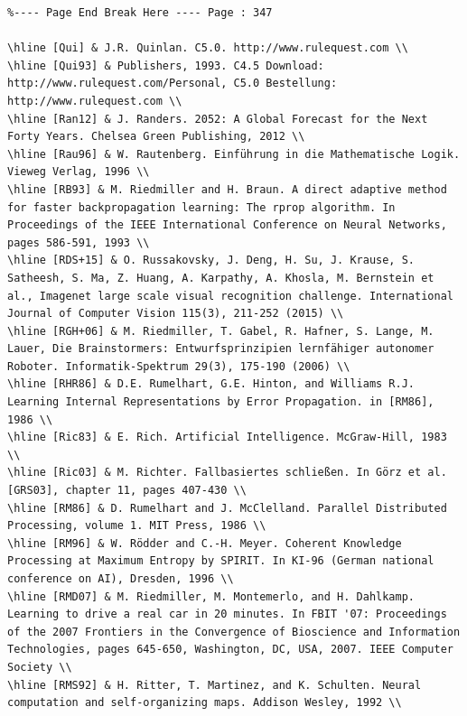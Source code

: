 \documentclass[10pt]{article}
\begin{document}
\begin{verbatim}
%---- Page End Break Here ---- Page : 347

\hline [Qui] & J.R. Quinlan. C5.0. http://www.rulequest.com \\
\hline [Qui93] & Publishers, 1993. C4.5 Download: http://www.rulequest.com/Personal, C5.0 Bestellung: http://www.rulequest.com \\
\hline [Ran12] & J. Randers. 2052: A Global Forecast for the Next Forty Years. Chelsea Green Publishing, 2012 \\
\hline [Rau96] & W. Rautenberg. Einführung in die Mathematische Logik. Vieweg Verlag, 1996 \\
\hline [RB93] & M. Riedmiller and H. Braun. A direct adaptive method for faster backpropagation learning: The rprop algorithm. In Proceedings of the IEEE International Conference on Neural Networks, pages 586-591, 1993 \\
\hline [RDS+15] & O. Russakovsky, J. Deng, H. Su, J. Krause, S. Satheesh, S. Ma, Z. Huang, A. Karpathy, A. Khosla, M. Bernstein et al., Imagenet large scale visual recognition challenge. International Journal of Computer Vision 115(3), 211-252 (2015) \\
\hline [RGH+06] & M. Riedmiller, T. Gabel, R. Hafner, S. Lange, M. Lauer, Die Brainstormers: Entwurfsprinzipien lernfähiger autonomer Roboter. Informatik-Spektrum 29(3), 175-190 (2006) \\
\hline [RHR86] & D.E. Rumelhart, G.E. Hinton, and Williams R.J. Learning Internal Representations by Error Propagation. in [RM86], 1986 \\
\hline [Ric83] & E. Rich. Artificial Intelligence. McGraw-Hill, 1983 \\
\hline [Ric03] & M. Richter. Fallbasiertes schließen. In Görz et al. [GRS03], chapter 11, pages 407-430 \\
\hline [RM86] & D. Rumelhart and J. McClelland. Parallel Distributed Processing, volume 1. MIT Press, 1986 \\
\hline [RM96] & W. Rödder and C.-H. Meyer. Coherent Knowledge Processing at Maximum Entropy by SPIRIT. In KI-96 (German national conference on AI), Dresden, 1996 \\
\hline [RMD07] & M. Riedmiller, M. Montemerlo, and H. Dahlkamp. Learning to drive a real car in 20 minutes. In FBIT '07: Proceedings of the 2007 Frontiers in the Convergence of Bioscience and Information Technologies, pages 645-650, Washington, DC, USA, 2007. IEEE Computer Society \\
\hline [RMS92] & H. Ritter, T. Martinez, and K. Schulten. Neural computation and self-organizing maps. Addison Wesley, 1992 \\

\end{verbatim}
\end{document}
